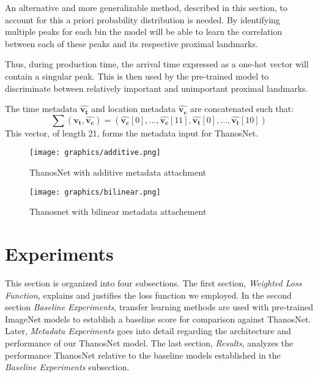 \documentclass[conference]{ieeeconf}
\newcommand{\uvec}[1]{\boldsymbol{\hat{#1}}}
\begin{document}
An alternative and more generalizable method, described in this section, to account for this a priori probability distribution is needed. By identifying multiple peaks for each bin the model will be able to learn the correlation between each of these peaks and its respective proximal landmarks. 

Thus, during production time, the arrival time expressed as a one-hot vector will contain a singular peak. This is then used by the pre-trained model to discriminate between relatively important and unimportant proximal landmarks.

The time metadata $\uvec{v_\textbf{t}}$ and location metadata $\uvec{v_\textbf{c}}$ are concatenated such that:
\begin{equation*}
    \sum (\uvec{v_\textbf{t}}, \uvec{v_\textbf{c}}) = (\uvec{v_\textbf{c}}[0], \ldots, \uvec{v_\textbf{c}}[11], \uvec{v_\textbf{t}}[0], \ldots, \uvec{v_\textbf{t}}[10])
\end{equation*}
This vector, of length 21, forms the metadata input for ThanosNet.



\begin{figure*}[!ht]
    \centering
  \texttt{[image: graphics/additive.png]}
  \caption{ThanosNet with additive metadata attachment}
  \label{fig:additiveThanosNet}
\end{figure*}
\begin{figure*}[!ht]
    \centering
  \texttt{[image: graphics/bilinear.png]}
  \caption{Thanosnet with bilinear metadata attachement}
  \label{fig:bilinearThanosNet}
\end{figure*}

\section{Experiments}

This section is organized into four subsections. The first section, \emph{Weighted Loss Function}, explains and justifies the loss function we employed. In the second section \emph{Baseline Experiments}, transfer learning methods are used with pre-trained ImageNet models to establish a baseline score for comparison against ThanosNet. Later, \emph{Metadata Experiments} goes into detail regarding the architecture and performance of our ThanosNet model. The last section, \emph{Results}, analyzes the performance ThanosNet relative to the baseline models established in the \emph{Baseline Experiments} subsection.
\end{document}
